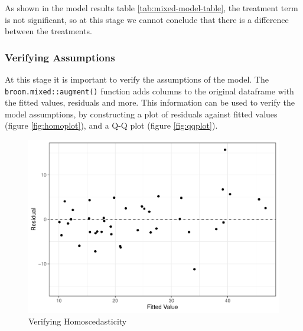 As shown in the model results table \ref{tab:mixed-model-table}, the
treatment term is not significant, so at this stage we cannot conclude
that there is a difference between the treatments.

\subsubsection{Verifying Assumptions}\label{verifying-assumptions}

At this stage it is important to verify the assumptions of the model.
The \texttt{broom.mixed::augment()} function adds columns to the
original dataframe with the fitted values, residuals and more. This
information can be used to verify the model assumptions, by constructing
a plot of residuals against fitted values (figure \ref{fig:homoplot}),
and a Q-Q plot (figure \ref{fig:qqplot}).

\begin{Shaded}
\begin{Highlighting}[]
\OtherTok{\textless{}{-}}\SpecialCharTok{\%\textgreater{}\%} \NormalTok{()}
\end{Highlighting}
\end{Shaded}

\begin{figure}
\centering
\includegraphics{ch4_files/figure-latex/homoplot-1.pdf}
\caption{Verifying Homoscedasticity}
\end{figure}

